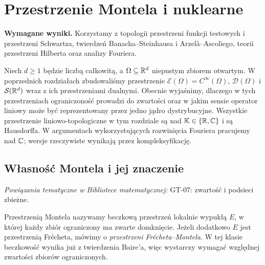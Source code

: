 
\section{Przestrzenie Montela i nuklearne}
\label{sec:montel-nuklearne23}

\providecommand{\atlasref}[2]{#2}


\noindent\textbf{Wymagane wyniki.} Korzystamy z topologii
przestrzeni funkcji testowych i przestrzeni Schwartza,
twierdzeń Banacha--Steinhausa i Arzelà--Ascoliego,
teorii przestrzeni Hilberta oraz analizy Fouriera.
\medskip

Niech $d\ge1$ będzie liczbą całkowitą, a $\Omega\subseteq\mathbb R^d$
niepustym zbiorem otwartym. W poprzednich rozdziałach
zbudowaliśmy przestrzenie
$\mathcal E(\Omega)=C^\infty(\Omega)$,
$\mathcal D(\Omega)$ i $\mathcal S(\mathbb R^d)$ wraz z ich
przestrzeniami dualnymi. Obecnie wyjaśnimy, dlaczego w tych
przestrzeniach ograniczoność prowadzi do zwartości oraz w jakim
sensie operator liniowy może być reprezentowany przez jedno jądro
dystrybucyjne. Wszystkie przestrzenie liniowo-topologiczne w tym
rozdziale są nad $\mathbb K\in\{\mathbb R,\mathbb C\}$ i są Hausdorffa. W argumentach
wykorzystujących rozwinięcia Fouriera pracujemy nad $\mathbb C$;
wersje rzeczywiste wynikają przez kompleksyfikację.

\subsection{Własność Montela i jej znaczenie}

\noindent\emph{Powiązania tematyczne w Bibliotece matematycznej:} \atlasref{GT-07::thm:topog-zwartosc-sieci}{GT-07: zwartość i podsieci zbieżne}.


\begin{definicja}
\label{def:montel23}
Przestrzenią Montela nazywamy beczkową przestrzeń lokalnie wypukłą
$E$, w której każdy zbiór ograniczony ma zwarte domknięcie.
Jeżeli dodatkowo $E$ jest przestrzenią Frécheta, mówimy o
\emph{przestrzeni Frécheta--Montela}. W tej klasie beczkowość
wynika już z twierdzenia Baire'a, więc wystarczy wymagać
względnej zwartości zbiorów ograniczonych.
\end{definicja}

